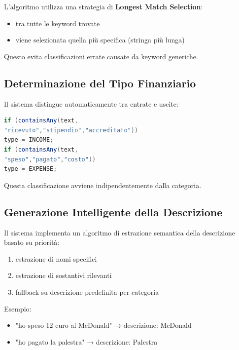 L'algoritmo utilizza una strategia di \textbf{Longest Match Selection}:

\begin{itemize}
    \item tra tutte le keyword trovate
    \item viene selezionata quella più specifica (stringa più lunga)
\end{itemize}

Questo evita classificazioni errate causate da keyword generiche.

\subsection{Determinazione del Tipo Finanziario}

Il sistema distingue automaticamente tra entrate e uscite:

\medskip

\begin{lstlisting}[language=Java]
if (containsAny(text,
"ricevuto","stipendio","accreditato"))
type = INCOME;
if (containsAny(text,
"speso","pagato","costo"))
type = EXPENSE;
\end{lstlisting}

Questa classificazione avviene indipendentemente dalla categoria.

\subsection{Generazione Intelligente della Descrizione}

Il sistema implementa un algoritmo di estrazione semantica della descrizione basato su priorità:

\begin{enumerate}
    \item estrazione di nomi specifici
    \item estrazione di sostantivi rilevanti
    \item fallback su descrizione predefinita per categoria
\end{enumerate}

Esempio:

\begin{itemize}
    \item "ho speso 12 euro al McDonald"
          → descrizione: McDonald

    \item "ho pagato la palestra"
          → descrizione: Palestra
\end{itemize}

